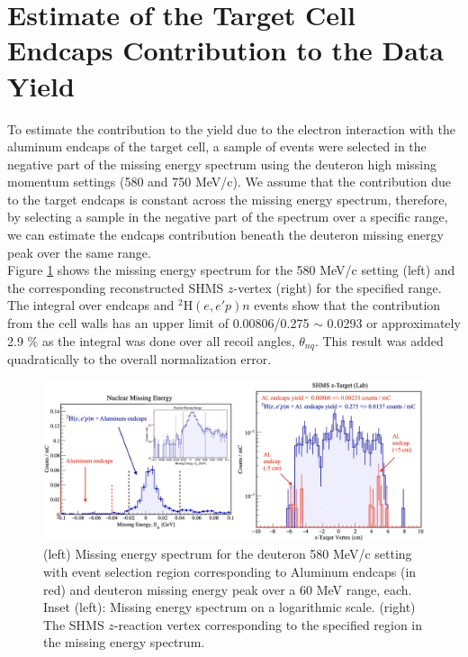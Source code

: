 \documentclass[aps, prl]{revtex4-2}  %
\begin{document}
\section{\large Estimate of the Target Cell Endcaps Contribution to the Data Yield}
\indent To estimate the contribution to the yield due to the electron interaction with the aluminum endcaps of the target cell,
a sample of events were selected in the negative part of the missing energy spectrum using the deuteron high missing momentum settings (580 and 750 MeV/c).
We assume that the contribution due to the target endcaps is constant across the missing energy spectrum, therefore, by selecting a sample in the
negative part of the spectrum over a specific range, we can estimate the endcaps contribution beneath the deuteron missing energy peak over the same range.\\
\indent Figure \ref{fig:tgt_wall} shows the missing energy spectrum for the 580 MeV/c setting (left) and the corresponding reconstructed SHMS $z$-vertex (right) for the specified
range. The integral over endcaps and $^{2}\mathrm{H}(e,e'p)n$ events show that the contribution from the cell walls has an upper limit of 0.00806/0.275 $\sim$ 0.0293 or approximately 2.9 $\%$
as the integral was done over all recoil angles, $\theta_{nq}$. This result was added quadratically to the overall normalization error.
\begin{figure}[!h]
\includegraphics[scale=0.33]{tgt_bkg_d2_pm580_allthnq.png}
\caption{(left) Missing energy spectrum for the deuteron 580 MeV/c setting with event selection region corresponding to Aluminum endcaps (in red) and deuteron missing energy peak over
  a 60 MeV range, each.  Inset (left): Missing energy spectrum on a logarithmic scale. (right) The SHMS $z$-reaction vertex corresponding to
  the specified region in the missing energy spectrum.}
\label{fig:tgt_wall}
\end{figure}
\end{document}
